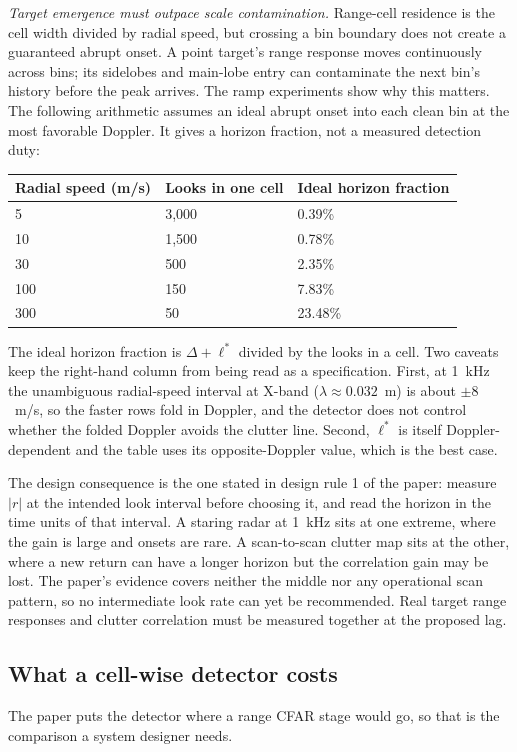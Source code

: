 \documentclass[10pt]{article}
\begin{document}
\emph{Target emergence must outpace scale contamination.} Range-cell residence is the cell width divided by radial speed, but crossing a bin boundary does not create a guaranteed abrupt onset. A point target's range response moves continuously across bins; its sidelobes and main-lobe entry can contaminate the next bin's history before the peak arrives. The ramp experiments show why this matters. The following arithmetic assumes an ideal abrupt onset into each clean bin at the most favorable Doppler. It gives a horizon fraction, not a measured detection duty:

\begin{center}\small
\begin{tabular}{lll}
\toprule
Radial speed (m/s) & Looks in one cell & Ideal horizon fraction\\
\midrule
5 & 3{,}000 & 0.39\%\\
10 & 1{,}500 & 0.78\%\\
30 & 500 & 2.35\%\\
100 & 150 & 7.83\%\\
300 & 50 & 23.48\%\\
\bottomrule
\end{tabular}
\end{center}

\noindent The ideal horizon fraction is $\Delta+\ell^{\ast}$ divided by the looks in a cell. Two
caveats keep the right-hand column from being read as a specification. First, at 1~kHz the
unambiguous radial-speed interval at X-band ($\lambda\approx0.032$~m) is about
$\pm8$~m/s, so the faster rows fold in Doppler, and the detector does not control
whether the folded Doppler avoids the clutter line. Second, $\ell^{\ast}$ is itself
Doppler-dependent and the table uses its opposite-Doppler value, which is the best case.

The design consequence is the one stated in design rule 1 of the paper: measure $|r|$ at the
intended look interval before choosing it, and read the horizon in the time units of that
interval. A staring radar at 1~kHz sits at one extreme, where the gain is large and onsets are
rare. A scan-to-scan clutter map sits at the other, where a new return can have a longer horizon but the
correlation gain may be lost. The paper's evidence covers neither the middle nor any operational scan pattern,
so no intermediate look rate can yet be recommended. Real target range responses and
clutter correlation must be measured together at the proposed lag.


\subsection{What a cell-wise detector costs}\label{sup:cost}
The paper puts the detector where a range CFAR stage would go, so that is the comparison a
system designer needs.
\end{document}
